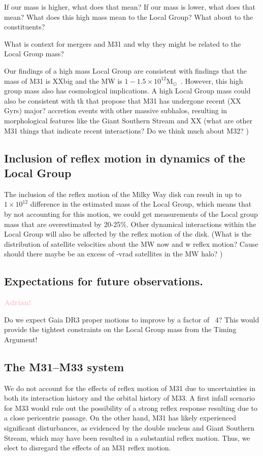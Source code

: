 \documentclass[twocolumn]{aastex631}
\newcommand{\kc}[1]{\textcolor{pink}{\textbf{#1}} }
\newcommand{\msun}{\ensuremath{\textrm{M}_{\odot}}}
\begin{document}
If our mass is higher, what does that mean? 
If our mass is lower, what does that mean?
What does this high mass mean to the Local Group? What about to the 
constituents? 

What is context for mergers and M31 and why they might be 
related to the Local Group mass?


Our findings of a high mass Local Group are consistent with findings that the 
mass of M31 is XXbig and the MW is $1-1.5\times10^{12}\msun$~\citep{??}. 
However, this high group mass also has cosmological implications. 
A high Local Group mass could also be consistent with tk that propose that M31 
has undergone recent (XX Gyrs) major? accretion events with other massive 
subhalos, resulting in morphological features like the Giant Southern Stream and 
XX (what are other M31 things that indicate recent interactions? Do we think 
much about M32? ) 

\subsection{Inclusion of reflex motion in dynamics of the Local Group}
The inclusion of the reflex motion of the Milky Way disk can result in up to 
$1\times10^{12}$ difference in the estimated mass of the Local Group, which 
means that by not accounting for this motion, we could get measurements of the 
Local group mass that are overestimated by 20-25\%.
Other dynamical interactions within the Local Group will also be affected by 
the reflex motion of the disk. (What is the distribution of satellite velocities 
about the MW now and w reflex motion? Cause should there maybe be an excess of 
-vrad satellites in the MW halo? )


\subsection{Expectations for future observations.}
\kc{Adrian!}

Do we expect Gaia DR3 proper motions to improve by a factor of ~4? 
This would provide the tightest constraints on the Local Group mass from the 
Timing Argument! 

\subsection{The M31--M33 system}
We do not account for the effects of reflex motion of M31 due to 
uncertainties in both its interaction history and the orbital history of 
M33. 
A first infall scenario for M33 would rule out the possibility of a 
strong reflex response resulting due to a close pericentric passage. 
On the other hand, M31 has likely experienced significant disturbances, as
evidenced by the double nucleus and Giant Southern Stream, 
which may have been resulted in a substantial reflex motion. 
Thus, we elect to disregard the effects of an M31 reflex motion. 
\end{document}
